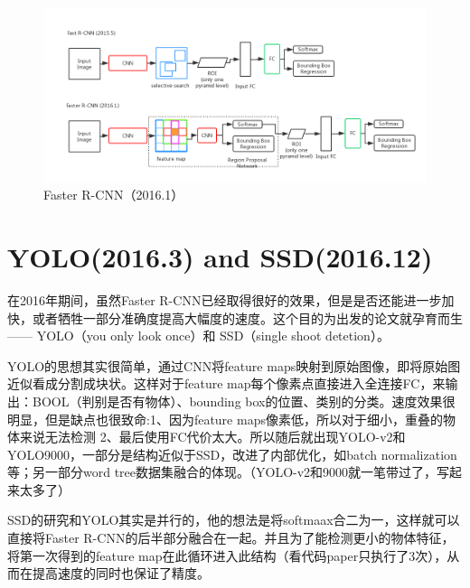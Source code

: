 \documentclass[a4paper,12pt]{report}
\begin{document}
\begin{spacing}{1.5}
\begin{figure}[!h]
	\begin{center}
		\includegraphics[width=0.92\linewidth]{figure//FasterRCNN.png}
		\caption{Faster R-CNN（2016.1）}
		\label{Fig:6}
	\end{center}
\end{figure}

\section{YOLO(2016.3) and SSD(2016.12) } 
在2016年期间，虽然Faster R-CNN已经取得很好的效果，但是是否还能进一步加快，或者牺牲一部分准确度提高大幅度的速度。这个目的为出发的论文就孕育而生—— YOLO（you only look once）和 SSD（single shoot detetion）。

YOLO的思想其实很简单，通过CNN将feature maps映射到原始图像，即将原始图近似看成分割成块状。这样对于feature map每个像素点直接进入全连接FC，来输出：BOOL（判别是否有物体）、bounding box的位置、类别的分类。速度效果很明显，但是缺点也很致命:1、因为feature maps像素低，所以对于细小，重叠的物体来说无法检测 2、最后使用FC代价太大。所以随后就出现YOLO-v2和YOLO9000，一部分是结构近似于SSD，改进了内部优化，如batch normalization等；另一部分word tree数据集融合的体现。（YOLO-v2和9000就一笔带过了，写起来太多了）

SSD的研究和YOLO其实是并行的，他的想法是将softmaax合二为一，这样就可以直接将Faster R-CNN的后半部分融合在一起。并且为了能检测更小的物体特征，将第一次得到的feature map在此循环进入此结构（看代码paper只执行了3次），从而在提高速度的同时也保证了精度。


\end{spacing}
\end{document}
